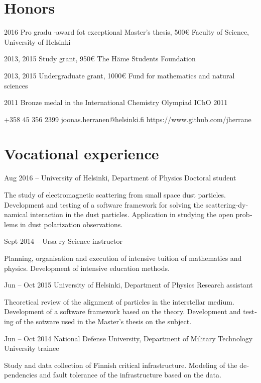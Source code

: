 \documentclass{tccv}
\begin{document}
\begin{otherlanguage}{english}
\section{Honors}
\begin{yearlist}
	\item{2016}
	{Pro gradu -award fot exceptional Master's thesis, 500€}
	{Faculty of Science, University of Helsinki}
	\item{2013, 2015}
	{Study grant, 950€}
	{The Häme Students Foundation}	
	\item{2013, 2015}
	{Undergraduate grant, 1000€}
	{Fund for mathematics and natural sciences}	
	\item{2011}
	{Bronze medal in the International Chemistry Olympiad}
	{IChO 2011}	
\end{yearlist}

{+358 45 356 2399}
{joonas.herranen@helsinki.fi}
{https://www.github.com/jherrane}

\section{Vocational experience}
\begin{eventlist}	
	\item{Aug 2016 -- }
	{University of Helsinki, Department of Physics}
	{Doctoral student}
	
	The study of electromagnetic scattering from small space dust particles. Development and testing of a software framework for solving the scattering-dynamical interaction in the dust particles. Application in studying the open problems in dust polarization observations.
	
	\item{Sept 2014 --}
	{Ursa ry}
	{Science instructor}
	
	Planning, organisation and execution of intensive tuition of mathematics and physics. Development of intensive education methods.
	
	\item{Jun -- Oct 2015}
	{University of Helsinki, Department of Physics}
	{Research assistant}
	
	Theoretical review of the alignment of particles in the interstellar medium. Development of a software framework based on the theory. Development and testing of the sotware used in the Master's thesis on the subject.
	
	\item{Jun -- Oct 2014}
	{National Defense University, \hspace*{2in} \linebreak
	Department of Military Technology}
	{University trainee}
	
	Study and data collection of Finnish critical infrastructure. Modeling of the dependencies and fault tolerance of the infrastructure based on the data.
	
\end{eventlist}
\end{otherlanguage}
\end{document}
